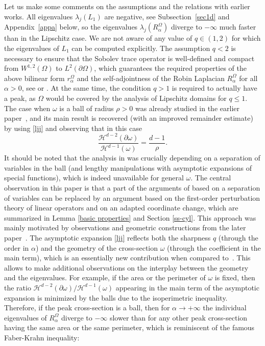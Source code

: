 \documentclass[11pt,oneside,reqno,a4paper]{amsart}
\renewcommand{\H}{\mathcal{H}}
\theoremstyle{definition}
\begin{document}
Let us make some comments on the assumptions and the relations with earlier works.
All eigenvalues $\lambda_j(L_1)$ are negative, see Subsection~\ref{sec1d} and Appendix~\ref{appa} below, so the eigenvalues $\lambda_j(R^\Omega_\alpha)$ diverge to $-\infty$ much faster than in the Lipschitz case. We are not aware of any value of $q\in(1,2)$ for which the eigenvalues of $L_1$ can be computed explicitly.
The assumption $q<2$ is necessary to ensure that the Sobolev trace operator is well-defined and compact from $W^{1,2}(\Omega)$ to $L^2(\partial\Omega)$, which guarantees the required properties of the above bilinear form $r^\Omega_\alpha$ and the self-adjointness of the Robin Laplacian $R^\Omega_\alpha$ for all $\alpha>0$, see \cite[Sec.~5.2]{daners} or \cite{acosta,nt}.
At the same time, the condition $q>1$ is required to actually have a peak, as $\Omega$ would be covered by the analysis of Lipschitz domains for $q\le 1$. The case when $\omega$ is a ball of radius $\rho>0$ was already studied in the earlier paper~\cite{kov}, and its main result is recovered (with an improved remainder estimate) by using \eqref{ljj} and observing that in this case
\[
\dfrac{\H^{d-2}(\partial\omega)}{\H^{d-1}(\omega)}=\dfrac{d-1}{\rho}.
\]
It should be noted that the analysis in \cite{kov} was crucially depending on a separation of variables in the ball (and lengthy manipulations with asymptotic expansions of special functions), which is indeed unavailable for general $\omega$. The central observation in this paper is that a part of the arguments of \cite{kov} based on a separation of variables can be replaced by an argument based on the first-order perturbation theory of linear operators and on an adapted coordinate change, which are summarized in Lemma \ref{basic properties} and Section \ref{ss-cyl}. This approach was mainly motivated by observations and geometric constructions from the
later paper~\cite{vogel}. The asymptotic expansion \eqref{ljj} reflects both the sharpness $q$ (through the order in $\alpha$) and the geometry of the cross-section $\omega$ (through the coefficient in the main term), which is an essentially new contribution when compared to~\cite{kov}.
This allows to make additional observations on the interplay between the geometry and the eigenvalues. For example, if the area or the perimeter of $\omega$ is fixed, then the ratio
$\H^{d-2}(\partial\omega)/\H^{d-1}(\omega)$
appearing in the main term of the asymptotic expansion is minimized by the balls due to the isoperimetric inequality. Therefore, if the peak cross-section is a ball, then for $\alpha\to+\infty$ the individual eigenvalues of $R^\Omega_\alpha$ diverge to $-\infty$ slower than for any other peak cross-section having the same area or the same perimeter, which is reminiscent of the famous Faber-Krahn inequality:
\end{document}
